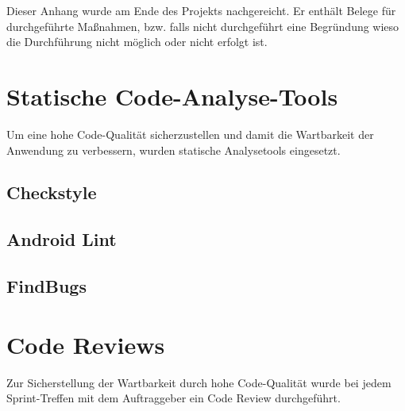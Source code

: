 
Dieser Anhang wurde am Ende des Projekts nachgereicht. Er enthält Belege für
durchgeführte Maßnahmen, bzw. falls nicht durchgeführt eine Begründung wieso
die Durchführung nicht möglich oder nicht erfolgt ist. \\

\raggedbottom


\setcounter{tocdepth}{3}

\section{Statische Code-Analyse-Tools}

Um eine hohe Code-Qualität sicherzustellen und damit die Wartbarkeit der
Anwendung zu verbessern, wurden statische Analysetools eingesetzt.

\subsection{Checkstyle}



\clearpage
\subsection{Android Lint}



\clearpage
\subsection{FindBugs}



\clearpage
\setcounter{tocdepth}{2}


\section{Code Reviews}

Zur Sicherstellung der Wartbarkeit durch hohe Code-Qualität wurde bei jedem
Sprint-Treffen mit dem Auftraggeber ein Code Review durchgeführt.


